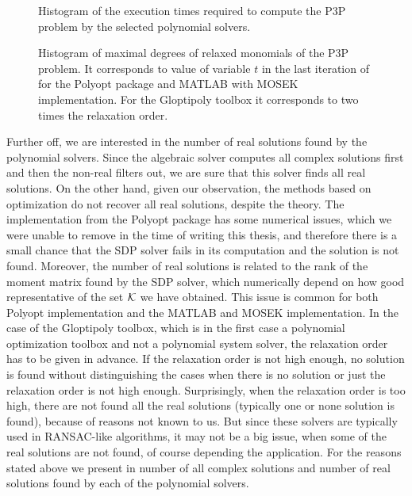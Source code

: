 \begin{figure}[ht]
  \centering
  \resizebox{0.95\textwidth}{!}{}
  \caption{Histogram of the execution times required to compute the P3P problem by the selected polynomial solvers.}
\end{figure}

\begin{figure}[ht]
  \centering
  \resizebox{0.95\textwidth}{!}{}
  \caption{Histogram of maximal degrees of relaxed monomials of the P3P problem. It corresponds to value of variable $t$ in the last iteration of  for the Polyopt package and MATLAB with MOSEK implementation. For the Gloptipoly toolbox it corresponds to two times the relaxation order.}
\end{figure}

Further off, we are interested in the number of real solutions found by the polynomial solvers.
Since the algebraic solver computes all complex solutions first and then the non-real filters out, we are sure that this solver finds all real solutions.
On the other hand, given our observation, the methods based on optimization do not recover all real solutions, despite the theory.
The implementation from the Polyopt package has some numerical issues, which we were unable to remove in the time of writing this thesis, and therefore there is a small chance that the SDP solver fails in its computation and the solution is not found.
Moreover, the number of real solutions is related to the rank of the moment matrix found by the SDP solver, which  numerically depend on how good representative of the set $\mathcal{K}$ we have obtained.
This issue is common for both Polyopt implementation and the MATLAB and MOSEK implementation.
In the case of the Gloptipoly toolbox, which is in the first case a polynomial optimization toolbox and not a polynomial system solver, the relaxation order has to be given in advance.
If the relaxation order is not high enough, no solution is found without distinguishing the cases when there is no solution or just the relaxation order is not high enough.
Surprisingly, when the relaxation order is too high, there are not found all the real solutions (typically one or none solution is found), because of reasons not known to us.
But since these solvers are typically used in RANSAC-like \cite{ransac} algorithms, it may not be a big issue, when some of the real solutions are not found, of course depending the application.
For the reasons stated above we present in  number of all complex solutions and number of real solutions found by each of the polynomial solvers.

